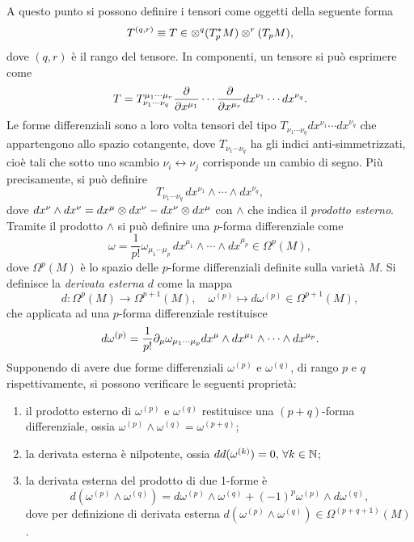 A questo punto si possono definire i tensori come oggetti della seguente forma
\begin{equation}
    T^{(q,r)} \equiv T \in \otimes^q(T_p^*M) \otimes^r(T_pM),
\end{equation}
dove $(q,r)$ è il rango del tensore. In componenti, un tensore si può esprimere come
\begin{equation}
    T = T^{\mu_1\cdots\mu_r}_{\nu_1\cdots\nu_q}\frac{\partial}{\partial x^{\mu_1}}\cdots\frac{\partial}{\partial x^{\mu_r}}dx^{\nu_1}\cdots dx^{\nu_q}.
\end{equation}
Le forme differenziali sono a loro volta tensori del tipo $T_{\nu_1\cdots\nu_q} dx^{\nu_1}\cdots dx^{\nu_q}$ che appartengono allo spazio cotangente, dove $T_{\nu_1\cdots\nu_q}$ ha gli indici anti-simmetrizzati, cioè tali che sotto uno scambio $\nu_i \leftrightarrow \nu_j$ corrisponde un cambio di segno. Più precisamente, si può definire 
\begin{equation}
    T_{\nu_1\cdots\nu_q}\,dx^{\nu_1}\wedge \cdots\wedge dx^{\nu_q},
\end{equation}
dove $dx^{\nu}\wedge dx^{\nu} = dx^\mu \otimes dx^\nu - dx^\nu \otimes dx^\mu$ con $\wedge$ che indica il \emph{prodotto esterno}. Tramite il prodotto $\wedge$ si può definire una $p$-forma differenziale come
\begin{equation}
    \omega = \frac{1}{p!}\omega_{\mu_1\cdots\mu_p}\,dx^{\mu_1}\wedge\cdots\wedge dx^{\mu_p} \in \Omega^p(M),
\end{equation}
dove $\Omega^p(M)$ è lo spazio delle $p$-forme differenziali definite sulla varietà $M$. Si definisce la \emph{derivata esterna} $d$ come la mappa
\begin{equation}
    d : \Omega^p(M) \to \Omega^{p + 1}(M),\quad \omega^{(p)} \mapsto d\omega^{(p)} \in \Omega^{p + 1}(M),
\end{equation}
che applicata ad una $p$-forma differenziale restituisce
\begin{equation}
    d\omega^{(p)} = \frac{1}{p!}\partial_\mu\omega_{\mu_1\cdots\mu_p}dx^\mu\wedge dx^{\mu_1}\wedge \cdots \wedge dx^{\mu_p}.
\end{equation}
Supponendo di avere due forme differenziali $\omega^{(p)}$ e $\omega^{(q)}$, di rango $p$ e $q$ rispettivamente, si possono verificare le seguenti proprietà:
\begin{enumerate}
    \item il prodotto esterno di $\omega^{(p)}$ e $\omega^{(q)}$ restituisce una $(p + q)$-forma differenziale, ossia $\omega^{(p)}\wedge\omega^{(q)} = \omega^{(p + q)}$;
    \item la derivata esterna è nilpotente, ossia $dd(\omega^{(k)}) = 0,\,\forall k \in \mathbb{N}$;
    \item la derivata esterna del prodotto di due 1-forme è
    \begin{equation}
        d(\omega^{(p)}\wedge\omega^{(q)}) = d\omega^{(p)} \wedge \omega^{(q)} + (-1)^p\omega^{(p)} \wedge d\omega^{(q)},
    \end{equation}
    dove per definizione di derivata esterna $d(\omega^{(p)}\wedge\omega^{(q)}) \in \Omega^{(p + q + 1)}(M)$.
\end{enumerate}
